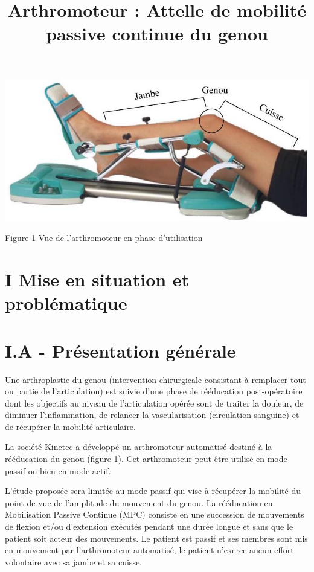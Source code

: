 \documentclass[10pt]{article}
\title{Arthromoteur : Attelle de mobilité passive continue du genou }
\author{}
\date{}
\begin{document}
\maketitle
\begin{center}
\includegraphics[max width=\textwidth]{2024_07_14_a83aebba33898893d39fg-01}
\end{center}

Figure 1 Vue de l'arthromoteur en phase d'utilisation

\section*{I Mise en situation et problématique}
\section*{I.A - Présentation générale}
Une arthroplastie du genou (intervention chirurgicale consistant à remplacer tout ou partie de l'articulation) est suivie d'une phase de rééducation post-opératoire dont les objectifs au niveau de l'articulation opérée sont de traiter la douleur, de diminuer l'inflammation, de relancer la vascularisation (circulation sanguine) et de récupérer la mobilité articulaire.

La société Kinetec a développé un arthromoteur automatisé destiné à la rééducation du genou (figure 1). Cet arthromoteur peut être utilisé en mode passif ou bien en mode actif.

L'étude proposée sera limitée au mode passif qui vise à récupérer la mobilité du point de vue de l'amplitude du mouvement du genou. La rééducation en Mobilisation Passive Continue (MPC) consiste en une succession de mouvements de flexion et/ou d'extension exécutés pendant une durée longue et sans que le patient soit acteur des mouvements. Le patient est passif et ses membres sont mis en mouvement par l'arthromoteur automatisé, le patient n'exerce aucun effort volontaire avec sa jambe et sa cuisse.
\end{document}
